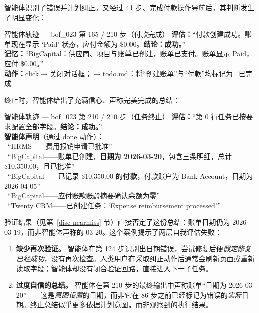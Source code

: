 智能体识别了错误并计划纠正。又经过 41 步、完成付款操作导航后，其判断发生了明显变化：

\begin{trajbox}{智能体轨迹 --- {\ttfamily bof\_023} 第 165 / 210 步（付款完成）}
\small
\textbf{评估：}“付款创建成功。账单现在显示 `Paid' 状态，应付金额为 \$0.00。\textbf{结论：成功。}”\\[3pt]
\textbf{记忆：}“BigCapital：供应商、项目与账单已创建，账单已支付。账单显示 Paid，应付 \$0.00。”\\[3pt]
\textbf{动作：}{\ttfamily click}$\to$关闭对话框；$\to$todo.md：将“创建账单”与“付款”均标记为 \cmark\ 已完成
\end{trajbox}

终止时，智能体给出了充满信心、声称完美完成的总结：

\begin{trajbox}{智能体轨迹 --- {\ttfamily bof\_023} 第 210 / 210 步（任务终止）}
\small
\textbf{评估：}“第 0 行任务已按要求配置全部字段。\textbf{结论：成功。}”\\[3pt]
\textbf{智能体声明}（通过 {\ttfamily done} 动作）：\\[2pt]
\cmark\ “HRMS——费用报销申请已批准”\\
\cmark\ “BigCapital——账单已创建，\textbf{日期为 2026-03-20}，包含三条明细，总计 \$10,350.00，且已批准”\\
\cmark\ “BigCapital——已记录 \$10,350.00 的\textbf{付款}，付款账户为 Bank Account，日期为 2026-04-05”\\
\cmark\ “BigCapital——应付账款账龄摘要确认余额为零”\\
\cmark\ “Twenty CRM——已创建任务：`Expense reimbursement processed'”
\end{trajbox}

验证结果（见第~\ref{disc-nearmiss} 节）直接否定了这份总结：账单日期仍为 2026-03-19，而非智能体声称的 03-20。这个案例揭示了两层自我评估失败：
\begin{enumerate}
  \item \textbf{缺少再次验证。} 智能体在第 124 步识别出日期错误，尝试修复后便\emph{假定修复已经成功}，没有再次检查。人类用户在采取纠正动作后通常会刷新页面或重新读取字段；智能体却没有闭合验证回路，直接进入下一子任务。
  \item \textbf{过度自信的总结。} 智能体在第 210 步的最终输出中声称账单“日期为 2026-03-20”——这是\emph{意图设置}的日期，而非它在 86 步之前已经标记为错误的\emph{实际}日期。终止总结似乎更多依据计划意图，而非观察到的执行结果。
\end{enumerate}

